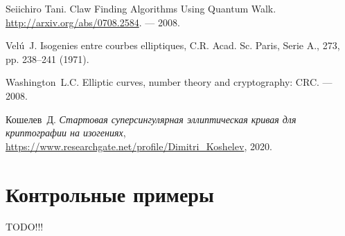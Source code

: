 \documentclass[a4paper,12pt]{article}
\theoremstyle{definition}
\begin{document}
\begin{thebibliography}{1}

  Seiichiro Tani. 
  \newblock Claw Finding Algorithms Using Quantum Walk. \url{http://arxiv.org/abs/0708.2584}. --- 2008.
  
  
   Vel\'{u}~J. \newblock Isogenies entre courbes elliptiques, C.R. Acad. Sc. Paris, Serie A., 273, pp. 238–241 (1971).

Washington~L.C.
\newblock Elliptic curves, number theory and cryptography: CRC.
\newblock --- 2008.


 Кошелев~Д. {\it Стартовая суперсингулярная эллиптическая кривая для криптографии на изогениях}, \url{https://www.researchgate.net/profile/Dimitri_Koshelev}, 2020.


\end{thebibliography}

\newpage 

\appendix
\section{Контрольные примеры}

TODO!!!
\end{document}
